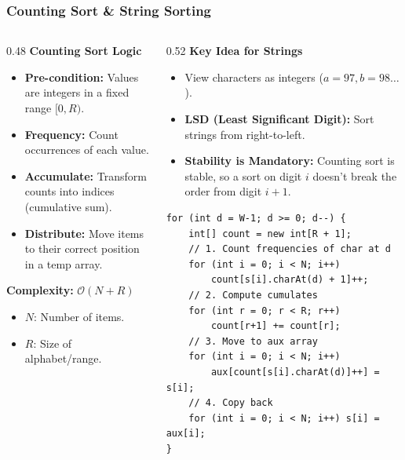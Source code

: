\documentclass[8pt,aspectratio=169]{beamer}
\begin{document}
\begin{frame}[t, fragile]
\frametitle{Counting Sort \& String Sorting}

\begin{columns}[T]
    \begin{column}{0.48\textwidth}
        \textbf{Counting Sort Logic}
        \begin{itemize}
            \item \textbf{Pre-condition:} Values are integers in a fixed range $[0, R)$.
            \item \textbf{Frequency:} Count occurrences of each value.
            \item \textbf{Accumulate:} Transform counts into indices (cumulative sum).
            \item \textbf{Distribute:} Move items to their correct position in a temp array.
        \end{itemize}
        \textbf{Complexity:} $\mathcal{O}(N + R)$
        \begin{itemize}
            \item $N$: Number of items.
            \item $R$: Size of alphabet/range.
        \end{itemize}
    \end{column}

    \begin{column}{0.52\textwidth}
        \textbf{Key Idea for Strings}
        \begin{itemize}
            \item View characters as integers ($a=97, b=98 \dots$).
            \item \textbf{LSD (Least Significant Digit):} Sort strings from right-to-left. 
            \item \textbf{Stability is Mandatory:} Counting sort is stable, so a sort on digit $i$ doesn't break the order from digit $i+1$.
        \end{itemize}
        \begin{lstlisting}[basicstyle=\tiny\ttfamily, frame=single, title=LSD String Sort]
for (int d = W-1; d >= 0; d--) {
    int[] count = new int[R + 1];
    // 1. Count frequencies of char at d
    for (int i = 0; i < N; i++)
        count[s[i].charAt(d) + 1]++;
    // 2. Compute cumulates
    for (int r = 0; r < R; r++)
        count[r+1] += count[r];
    // 3. Move to aux array
    for (int i = 0; i < N; i++)
        aux[count[s[i].charAt(d)]++] = s[i];
    // 4. Copy back
    for (int i = 0; i < N; i++) s[i] = aux[i];
}
        \end{lstlisting}
    \end{column}
\end{columns}
\end{frame}
\end{document}
